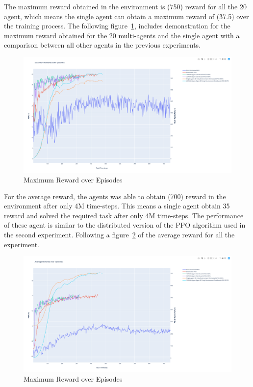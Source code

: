 The maximum reward obtained in the environment is (750) reward for all the 20 agent, which means the single agent can obtain a maximum reward of (\~37.5) over the training process. The following figure~\ref{fig:4th_exp_max_eps_reward}, includes demonstration for the maximum reward obtained for the 20 multi-agents and the single agent with a comparison between all other agents in the previous experiments.
\begin{figure}[!htb]
		\centering
		\includegraphics[width=\linewidth]{figures/exps/4th_exp/max_eps_reward.png}
		\caption{Maximum Reward over Episodes}
		\label{fig:4th_exp_max_eps_reward}
\end{figure}

For the average reward, the agents was able to obtain (700) reward in the environment after only 4M time-steps. This means a single agent obtain 35 reward and solved the required task after only 4M time-steps. The performance of these agent is similar to the distributed version of the PPO algorithm used in the second experiment. Following a figure~\ref{fig:4th_exp_avg_eps_reward} of the average reward for all the experiment.
\begin{figure}[!htb]
		\centering
		\includegraphics[width=\linewidth]{figures/exps/4th_exp/avg_eps_reward.png}
		\caption{Maximum Reward over Episodes}
		\label{fig:4th_exp_avg_eps_reward}
\end{figure}


